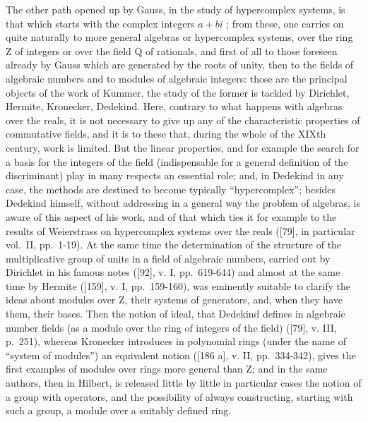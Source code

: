 The other path opened up by Gauss, in the study of hypercomplex systems, is that which starts with the complex integers \(a + bi\) ; from these, one carries on quite naturally to more general algebras or hypercomplex systems, over the ring Z of integers or over the field Q of rationals, and first of all to those foreseen already by Gauss which are generated by the roots of unity, then to the fields of algebraic numbers and to modules of algebraic integers: those are the principal objects of the work of Kummer, the study of the former is tackled by Dirichlet, Hermite, Kronecker, Dedekind. Here, contrary to what happens with algebras over the reals, it is not necessary to give up any of the characteristic properties of commutative fields, and it is to these that, during the whole of the XIXth century, work is limited. But the linear properties, and for example the search for a basis for the integers of the field (indispensable for a general definition of the discriminant) play in many respects an essential role; and, in Dedekind in any case, the methods are destined to become typically ``hypercomplex''; besides Dedekind himself, without addressing in a general way the problem of algebras, is aware of this aspect of his work, and of that which ties it for example to the results of Weierstrass on hypercomplex systems over the reals ({[}79{]}, in particular vol.~II, pp.~1-19). At the same time the determination of the structure of the multiplicative group of units in a field of algebraic numbers, carried out by Dirichlet in his famous notes ({[}92{]}, v. I, pp.~619-644) and almost at the same time by Hermite ({[}159{]}, v. I, pp.~159-160), was eminently suitable to clarify the ideas about modules over Z, their systems of generators, and, when they have them, their bases. Then the notion of ideal, that Dedekind defines in algebraic number fields (as a module over the ring of integers of the field) ({[}79{]}, v. III, p.~251), whereas Kronecker introduces in polynomial rings (under the name of ``system of modules'') an equivalent notion ({[}186 a{]}, v. II, pp.~334-342), gives the first examples of modules over rings more general than Z; and in the same authors, then in Hilbert, is released little by little in particular cases the notion of a group with operators, and the possibility of always constructing, starting with such a group, a module over a suitably defined ring.

